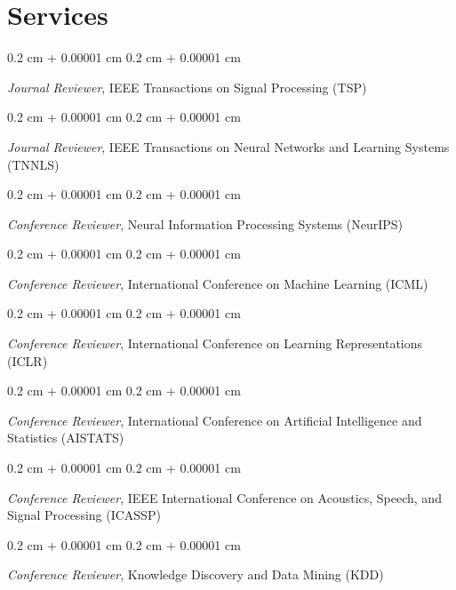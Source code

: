 \documentclass[10pt, letterpaper]{article}
\newenvironment{onecolentry}{
    \begin{adjustwidth}{
        0.2 cm + 0.00001 cm
    }{
        0.2 cm + 0.00001 cm
    }
}{
    \end{adjustwidth}
} %
\begin{document}
\section{Services}
    \begin{onecolentry}
        \textit{Journal Reviewer}, IEEE Transactions on Signal Processing (TSP)
    \end{onecolentry}
    \vspace{0.1cm}
    \begin{onecolentry}
        \textit{Journal Reviewer}, IEEE Transactions on Neural Networks and Learning Systems (TNNLS)
    \end{onecolentry}
    \vspace{0.1cm}
    \begin{onecolentry}
        \textit{Conference Reviewer}, Neural Information Processing Systems (NeurIPS)
    \end{onecolentry}
    \vspace{0.1cm}
    \begin{onecolentry}
        \textit{Conference Reviewer}, International Conference on Machine Learning (ICML)
    \end{onecolentry}
        \vspace{0.1cm}
    \begin{onecolentry}
        \textit{Conference Reviewer}, International Conference on Learning Representations (ICLR)
    \end{onecolentry}
    \vspace{0.1cm}
    \begin{onecolentry}
        \textit{Conference Reviewer}, International Conference on Artificial Intelligence and Statistics (AISTATS)
    \end{onecolentry}
    \vspace{0.1cm}
    \begin{onecolentry}
        \textit{Conference Reviewer}, IEEE International Conference on Acoustics, Speech, and Signal Processing (ICASSP)
    \end{onecolentry}
    \vspace{0.1cm}
    \begin{onecolentry}
        \textit{Conference Reviewer}, Knowledge Discovery and Data Mining (KDD)
    \end{onecolentry}
\end{document}
